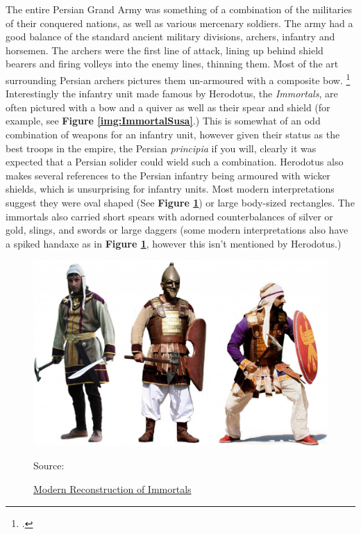 \documentclass[twoside, a4paper, 12pt]{article}
\newcommand{\sourceR}[1]{\caption*{\hfill Source: {#1}} }
\begin{document}
\par\vspace{1em}

The entire Persian Grand Army was something of a combination of the militaries
of their conquered nations, as well as various mercenary soldiers. The army had
a good balance of the standard ancient military divisions, archers, infantry
and horsemen. The archers were the first line of attack, lining up behind
shield bearers and firing volleys into the enemy lines, thinning them. Most
of the art surrounding Persian archers pictures them un-armoured with a composite
bow. \footcite{dhwty_2015}
Interestingly the infantry unit made famous by Herodotus, the \emph{Immortals},
are often pictured with a bow and a quiver as well as their spear and shield
(for example, see \textbf{Figure \ref{img:ImmortalSusa}}.)
This is somewhat of an odd combination of weapons for an infantry unit,
however given their status as the best troops in the empire, the Persian
\emph{principia} if you will, clearly it was expected that a Persian solider
could wield such a combination. Herodotus also makes several references to
the Persian infantry being armoured with wicker shields, which is unsurprising
for infantry units. Most modern interpretations suggest they were oval shaped
(See \textbf{Figure \ref{img:ImmortalModern}}) or large body-sized rectangles.
The immortals also carried short spears with adorned counterbalances of silver
or gold, slings, and swords or large daggers (some modern interpretations also
have a spiked handaxe as in \textbf{Figure \ref{img:ImmortalModern}}, however
this isn't mentioned by Herodotus.)

\begin{figure}
  \centering
  \includegraphics[width=\linewidth]{ModernImmortalReco.jpg}
  \captionsetup{justification=raggedleft}
  \caption{\ul{Modern Reconstruction of Immortals}}
  \sourceR{\cite{farrokh_2013}}
  \label{img:ImmortalModern}
\end{figure}
\end{document}
